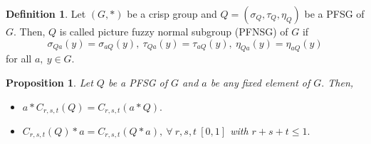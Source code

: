 \documentclass[12pt,letterpaper]{amsart}
\theoremstyle{plain}
\newtheorem{proposition}{Proposition}[section]
\theoremstyle{definition}
\newtheorem{definition}{Definition}[section]
\numberwithin{equation}{section}
\begin{document}
\begin{definition}\cite{dp}
Let $(G, \ast)$ be a crisp group and $Q = (\sigma_{Q}, \tau_Q, \eta_Q)$ be a PFSG of $G$. Then, $Q$ is called picture fuzzy normal subgroup (PFNSG) of $G$ if $$\sigma_{Qa}(y) = \sigma_{aQ}(y),~ \tau_{Qa}(y) = \tau_{aQ}(y),~ \eta_{Qa}(y) = \eta_{aQ}(y)$$ for all $a,~ y \in G$.
\end{definition}

\begin{proposition} \cite{so}
Let $Q$ be a PFSG of $G$ and $a$ be any fixed element of $G.$ Then, \ \\ \begin{itemize}
\item [(i.)] $a \ast C_{r, s, t} (Q) = C_{r, s, t} (a \ast Q).$ \ \\ \item [(ii.)] $C_{r, s, t} (Q) \ast a = C_{r, s, t} (Q \ast a),~ \forall~ r, s, t \ [0, 1] $ with $r + s + t \leq 1.$
\end{itemize}
\end{proposition}
\end{document}
